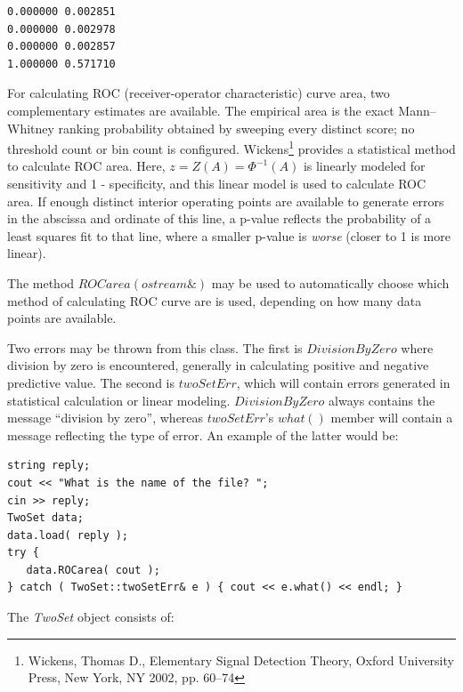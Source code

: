\documentclass{report}
\begin{document}
\begin{verbatim}
0.000000 0.002851
0.000000 0.002978
0.000000 0.002857
1.000000 0.571710
\end{verbatim}

For calculating ROC (receiver-operator characteristic) curve area, two
complementary estimates are available.  The empirical area is the exact
Mann--Whitney ranking probability obtained by sweeping every distinct
score; no threshold count or bin count is configured.  Wickens\footnote{Wickens, Thomas D., Elementary Signal
Detection Theory, Oxford University Press, New York, NY 2002,
pp. 60--74} provides a statistical method to
calculate ROC area.  Here, \hyperref[invZarea]
{$z = Z(A) = \Phi^{-1}(A)$} is linearly modeled for sensitivity and
1 - specificity, and this linear model is used to calculate ROC area.
If enough distinct interior operating points are available to generate errors
in the abscissa and ordinate of this line, a p-value reflects
the probability of a least squares fit to that line, where a smaller
p-value is {\em worse} (closer to 1 is more linear).

The method $ROCarea( ostream\& )$ may be used to automatically choose
which method of calculating ROC curve are is used, depending on how
many data points are available.

Two errors may be thrown from this class.  The first is
$DivisionByZero$ where division by zero is encountered, generally in
calculating positive and negative predictive value.  The second is
$twoSetErr$, which will contain errors generated in statistical
calculation or linear modeling. $DivisionByZero$ always contains the
message ``division by zero'', whereas $twoSetErr$'s $what()$ member
will contain a message reflecting the type of error.  An example of
the
latter would be:

\begin{verbatim}
string reply;
cout << "What is the name of the file? ";
cin >> reply;
TwoSet data;
data.load( reply );
try {
   data.ROCarea( cout );
} catch ( TwoSet::twoSetErr& e ) { cout << e.what() << endl; }
\end{verbatim}

The {\em TwoSet} object consists of:
\end{document}
